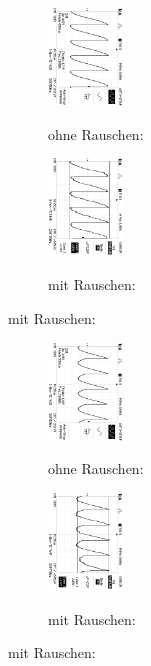 \addtocounter{figure}{-1}
\begin{figure}
\caption{$U_{out} (\phi = 90°$) }
\begin{subfigure}{0.48\textwidth}
\centering
\caption*{ohne Rauschen:}
\includegraphics[angle=90,height=2.6cm]{graphics/ALL0033/F0033TEK.jpg}
\label{fig:phi90o}
\end{subfigure}
\begin{subfigure}{0.48\textwidth}
\centering
\caption*{mit Rauschen:}
\includegraphics[angle=90,height=2.6cm]{graphics/ALL0041/F0041TEK.jpg}
\label{fig:phi90m}
\end{subfigure}
\end{figure}
\addtocounter{figure}{-1}
\begin{figure}
\caption{$U_{out} (\phi = 135°$)}
\begin{subfigure}{0.48\textwidth}
\centering
\caption*{ohne Rauschen:}
\includegraphics[angle=90,height=2.6cm]{graphics/ALL0032/F0032TEK.jpg}
\label{fig:phi135o}
\end{subfigure}
\begin{subfigure}{0.48\textwidth}
\centering
\caption*{mit Rauschen:}
\includegraphics[angle=90,height=2.6cm]{graphics/ALL0040/F0040TEK.jpg}
\label{fig:phi135m}
\end{subfigure}
\end{figure}
\addtocounter{figure}{-1}
